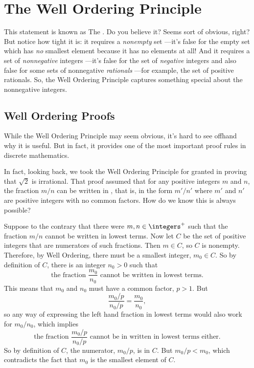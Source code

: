 \chapter{The Well Ordering Principle}
\label{well_ordering_chap}


This statement is known as The .  Do you
believe it?  Seems sort of obvious, right?  But notice how tight it is: it
requires a \emph{nonempty} set ---it's false for the empty set which has
\emph{no} smallest element because it has no elements at all!  And it
requires a set of \emph{nonnegative} integers ---it's false for the set of
\emph{negative} integers and also false for some sets of nonnegative
\emph{rationals} ---for example, the set of positive rationals.  So, the
Well Ordering Principle captures something special about the nonnegative
integers.

\section{Well Ordering Proofs}

While the Well Ordering Principle may seem obvious, \iffalse it looks
nothing like the induction axiom, and\fi it's hard to see offhand why it
is useful.  But in fact, it provides one of the most important proof rules
in discrete mathematics.  \iffalse We'll explain this after we introduce a
template for well ordering principle proofs resembling the template in
Section~\ref{templ-induct-proofs} for a proof by strong induction.\fi

In fact, looking back, we took the Well Ordering Principle for granted in
proving that $\sqrt{2}$ is irrational.  That proof assumed that for any
positive integers $m$ and $n$, the fraction $m/n$ can be written in
, that is, in the form $m'/n'$ where $m'$ and $n'$
are positive integers with no common factors.  How do we know this is
always possible?

Suppose to the contrary that there were $m,n \in \integers^+$ such that the
fraction $m/n$ cannot be written in lowest terms.  Now let $C$ be the set
of positive integers that are numerators of such fractions.  Then $m \in
C$, so $C$ is nonempty.  Therefore, by Well Ordering, there must be a
smallest integer, $m_0 \in C$.  So by definition of $C$, there is an
integer $n_0 > 0$ such that
\[
\text{the fraction } \frac{m_0}{n_0} \text{ cannot be written in lowest
terms.}
\]
This means that $m_0$ and $n_0$ must have a common factor, $p>1$.  But
\[
\frac{m_0/p}{n_0/p} = \frac{m_0}{n_0},
\]
so any way of expressing the left hand fraction in lowest terms would also
work for $m_0/n_0$, which implies
\[
\text{the fraction } \frac{m_0/p}{n_0/p} \text{ cannot be in written in
lowest terms either.}
\]
So by definition of $C$, the numerator, $m_0/p$, is in $C$.  But $m_0/p <
m_0$, which contradicts the fact that $m_0$ is the smallest element of $C$.

